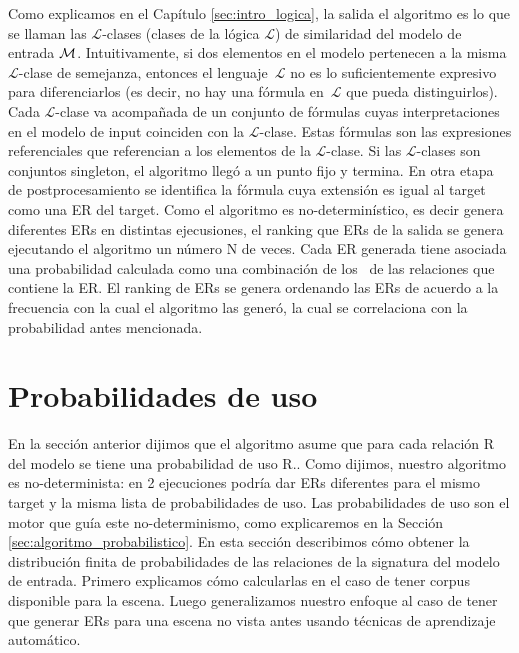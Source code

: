 Como explicamos en el Cap\'itulo \ref{sec:intro_logica}, la salida el algoritmo es lo que se llaman las $\mathcal {L}$-clases (clases de la l\'ogica $\mathcal {L}$) de similaridad del modelo de entrada $\mathcal{M} $. Intuitivamente, si dos elementos en el modelo pertenecen a la misma $\mathcal {L}$-clase de semejanza, entonces el lenguaje~$\mathcal {L}$ no es lo suficientemente expresivo para diferenciarlos (es decir, no hay una f\'ormula en~$\mathcal {L }$ que pueda distinguirlos). Cada  $\mathcal {L}$-clase va acompa\~nada de un conjunto de f\'ormulas cuyas interpretaciones en el modelo de input coinciden con la $\mathcal {L}$-clase. Estas f\'ormulas son las expresiones referenciales que referencian a los elementos de la $\mathcal {L}$-clase. Si las $\mathcal {L}$-clases son conjuntos singleton, el algoritmo lleg\'o a un punto fijo y termina. En otra etapa de postprocesamiento se identifica la f\'ormula cuya extensi\'on es igual al target como una ER del target. Como el algoritmo es no-determin\'istico, es decir genera diferentes ERs en distintas ejecusiones, el ranking que ERs de la salida se genera ejecutando el algoritmo un n\'umero N de veces. Cada ER generada tiene asociada una probabilidad calculada como una combinaci\'on de los \puse\ de las relaciones que contiene la ER. El ranking de ERs se genera ordenando las ERs de acuerdo a la frecuencia con la cual el algoritmo las gener\'o, la cual se correlaciona con la probabilidad antes mencionada.

\section{Probabilidades de uso}
\label{sec:learning}

En la secci\'on anterior dijimos que el algoritmo asume que para cada relaci\'on R del modelo se tiene una probabilidad de uso R.\puse. Como dijimos, nuestro algoritmo es no-determinista: en 2 ejecuciones podr\'ia dar ERs diferentes para el mismo target y la misma lista de probabilidades de uso. Las probabilidades de uso son el motor que gu\'ia este no-determinismo, como explicaremos en la Secci\'on \ref{sec:algoritmo_probabilistico}. En esta secci\'on describimos c\'omo obtener la distribuci\'on finita de probabilidades de las relaciones de la signatura del modelo de entrada. Primero explicamos c\'omo calcularlas en el caso de tener corpus disponible para la escena. Luego generalizamos nuestro enfoque al caso de tener que generar ERs para una escena no vista antes usando t\'ecnicas de aprendizaje autom\'atico.  


